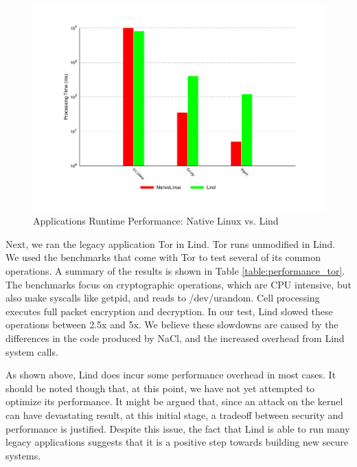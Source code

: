 \begin{figure}
\centering
\includegraphics[width=1.6\columnwidth]{diagram/lind_oakland16_performance.pdf}
\caption{Applications Runtime Performance: Native Linux vs. Lind }
\label{fig:performance_applications}
\end{figure}

Next, we ran the legacy application Tor in Lind. Tor runs unmodified in
Lind. 
We used the benchmarks that come with Tor to test several of its common
operations. 
A summary of the results is shown in Table \ref{table:performance_tor}. The
benchmarks focus on cryptographic operations, 
which are CPU intensive, but also make syscalls like getpid, and reads to
/dev/urandom.
Cell processing executes full packet encryption and decryption. In our
test, 
Lind slowed these operations between 2.5x and 5x. We believe these
slowdowns 
are caused by the differences in the code produced by NaCl, and the
increased overhead from Lind system calls. 

As shown above,  Lind does incur some performance overhead in most cases. 
It should be noted though that, at this point, we have not  yet attempted
to optimize its performance. 
It might be argued that, since an attack on the kernel can have devastating
result, at this initial stage, 
a tradeoff between security and performance is justified. Despite this
issue, 
the fact that Lind is able to run many legacy applications suggests that it
is a positive step towards building new secure systems. 

